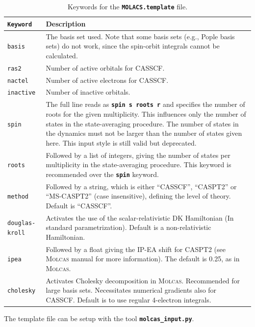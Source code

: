 \documentclass[a4paper,11pt,DIV=15,openany,twoside=false]{scrbook}
\newcommand{\ttt}[1]{\textbf{\texttt{#1}}}
\begin{document}
\begin{table}
  \centering
  \caption{Keywords for the \ttt{MOLACS.template} file.}
  \label{tab:molcas_temp}
  \begin{tabular}{>{\tt}lp{12cm}}
  \toprule
  Keyword       &Description\\
  \midrule
basis           &The basis set used. Note that some basis sets (e.g., Pople basis sets) do not work, since the spin-orbit integrals cannot be calculated.\\
ras2            &Number of active orbitals for CASSCF.\\
nactel          &Number of active electrons for CASSCF.\\
inactive        &Number of inactive orbitals.\\
spin            &The full line reads as \ttt{spin s roots r} and specifies the number of roots for the given multiplicity. This influences only the number of states in the state-averaging procedure. The number of states in the dynamics must not be larger than the number of states given here. This input style is still valid but deprecated.\\
roots           &Followed by a list of integers, giving the number of states per multiplicity in the state-averaging procedure. This keyword is recommended over the \ttt{spin} keyword.\\
method          &Followed by a string, which is either ``CASSCF'', ``CASPT2'' or ``MS-CASPT2'' (case insensitive), defining the level of theory. Default is ``CASSCF''.\\
douglas-kroll   &Activates the use of the scalar-relativistic DK Hamiltonian (In standard parametrization). Default is a non-relativistic Hamiltonian.\\
ipea            &Followed by a float giving the IP-EA shift for CASPT2 (see \textsc{Molcas} manual for more information). The default is 0.25, as in \textsc{Molcas}.\\
cholesky        &Activates Cholesky decomposition in \textsc{Molcas}. Recommended for large basis sets. Necessitates numerical gradients also for CASSCF. Default is to use regular 4-electron integrals.\\
  \bottomrule
  \end{tabular}
\end{table}

The template file can be setup with the tool \ttt{molcas\_input.py}.
\end{document}
